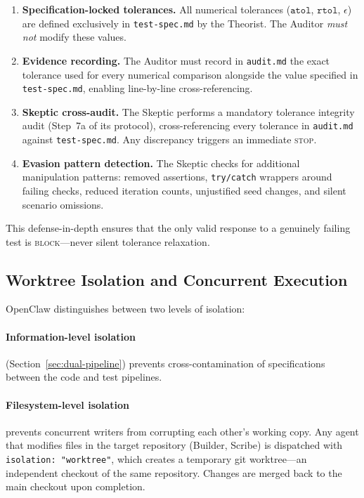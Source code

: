 \begin{enumerate}[leftmargin=*,label=(\roman*),itemsep=3pt]
  \item \textbf{Specification-locked tolerances.} All numerical
    tolerances ($\texttt{atol}$, $\texttt{rtol}$, $\epsilon$) are
    defined exclusively in \texttt{test-spec.md} by the Theorist.
    The Auditor \emph{must not} modify these values.

  \item \textbf{Evidence recording.} The Auditor must record in
    \texttt{audit.md} the exact tolerance used for every numerical
    comparison alongside the value specified in
    \texttt{test-spec.md}, enabling line-by-line cross-referencing.

  \item \textbf{Skeptic cross-audit.} The Skeptic performs a
    mandatory tolerance integrity audit (Step~7a of its protocol),
    cross-referencing every tolerance in \texttt{audit.md} against
    \texttt{test-spec.md}. Any discrepancy triggers an immediate
    \textsc{stop}.

  \item \textbf{Evasion pattern detection.} The Skeptic checks for
    additional manipulation patterns: removed assertions,
    \texttt{try/catch} wrappers around failing checks, reduced
    iteration counts, unjustified seed changes, and silent scenario
    omissions.
\end{enumerate}

\noindent
This defense-in-depth ensures that the only valid response to a
genuinely failing test is \textsc{block}---never silent tolerance
relaxation.


\subsection{Worktree Isolation and Concurrent Execution}
\label{sec:worktree}

OpenClaw distinguishes between two levels of isolation:

\paragraph{Information-level isolation} (Section~\ref{sec:dual-pipeline})
prevents cross-contamination of specifications between the code and
test pipelines.

\paragraph{Filesystem-level isolation} prevents concurrent writers
from corrupting each other's working copy. Any agent that modifies
files in the target repository (Builder, Scribe) is dispatched with
\texttt{isolation: "worktree"}, which creates a temporary git
worktree---an independent checkout of the same repository. Changes
are merged back to the main checkout upon completion.

